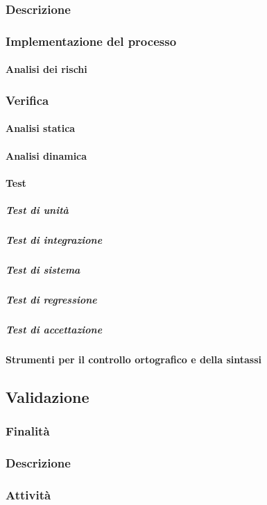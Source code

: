 \documentclass[../norme-di-progetto.tex]{subfiles}
\begin{document}
\subsubsection{Descrizione}
\subsubsection{Implementazione del processo}
\paragraph{Analisi dei rischi}
\subsubsection{Verifica}
\paragraph{Analisi statica}
\paragraph{Analisi dinamica}
\paragraph{Test}
\subparagraph{Test di unità}
\subparagraph{Test di integrazione}
\subparagraph{Test di sistema}
\subparagraph{Test di regressione}
\subparagraph{Test di accettazione}
\paragraph{Strumenti per il controllo ortografico e della sintassi}
\subsection{Validazione}
\subsubsection{Finalità}
\subsubsection{Descrizione}
\subsubsection{Attività}
\end{document}
